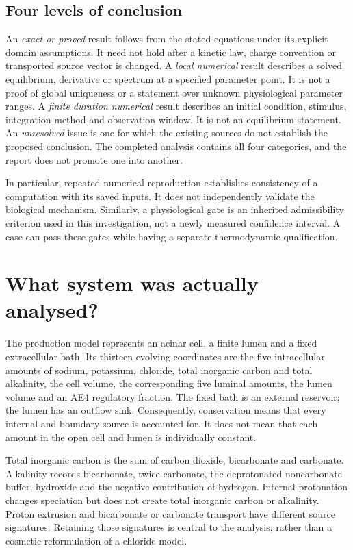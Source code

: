 \subsection{Four levels of conclusion}
An \emph{exact or proved} result follows from the stated equations under its explicit domain assumptions. It need not hold after a kinetic law, charge convention or transported source vector is changed. A \emph{local numerical} result describes a solved equilibrium, derivative or spectrum at a specified parameter point. It is not a proof of global uniqueness or a statement over unknown physiological parameter ranges. A \emph{finite duration numerical} result describes an initial condition, stimulus, integration method and observation window. It is not an equilibrium statement. An \emph{unresolved} issue is one for which the existing sources do not establish the proposed conclusion. The completed analysis contains all four categories, and the report does not promote one into another.

In particular, repeated numerical reproduction establishes consistency of a computation with its saved inputs. It does not independently validate the biological mechanism. Similarly, a physiological gate is an inherited admissibility criterion used in this investigation, not a newly measured confidence interval. A case can pass these gates while having a separate thermodynamic qualification.

\section{What system was actually analysed?}
\label{sec:report-state}
The production model represents an acinar cell, a finite lumen and a fixed extracellular bath. Its thirteen evolving coordinates are the five intracellular amounts of sodium, potassium, chloride, total inorganic carbon and total alkalinity, the cell volume, the corresponding five luminal amounts, the lumen volume and an AE4 regulatory fraction. The fixed bath is an external reservoir; the lumen has an outflow sink. Consequently, conservation means that every internal and boundary source is accounted for. It does not mean that each amount in the open cell and lumen is individually constant.

Total inorganic carbon is the sum of carbon dioxide, bicarbonate and carbonate. Alkalinity records bicarbonate, twice carbonate, the deprotonated noncarbonate buffer, hydroxide and the negative contribution of hydrogen. Internal protonation changes speciation but does not create total inorganic carbon or alkalinity. Proton extrusion and bicarbonate or carbonate transport have different source signatures. Retaining those signatures is central to the analysis, rather than a cosmetic reformulation of a chloride model.

